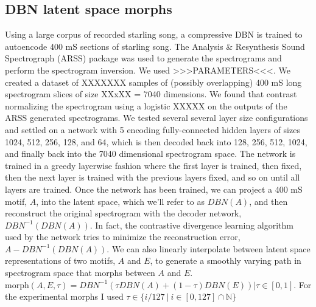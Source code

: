 \subsection*{\ac{DBN} latent space morphs}
Using a large corpus of recorded starling song, a compressive \ac{DBN} \cite{hinton2006reducing} is trained to autoencode 400 mS sections of starling song. The Analysis \& Resynthesis Sound Spectrograph (ARSS) package was used to generate the spectrograms and perform the spectrogram inversion. We used >>>PARAMETERS<<<. We created a dataset of XXXXXXX samples of (possibly overlapping) 400 mS long spectrogram slices of size XXxXX = 7040 dimensions. We found that contrast normalizing the spectrogram using a logistic XXXXX on the outputs of the ARSS generated spectrograms. We tested several several layer size configurations and settled on a network with 5 encoding fully-connected hidden layers of sizes 1024, 512, 256, 128, and 64, which is then decoded back into 128, 256, 512, 1024, and finally back into the 7040 dimensional spectrogram space. The network is trained in a greedy layerwise fashion where the first layer is trained, then fixed, then the next layer is trained with the previous layers fixed, and so on until all layers are trained. Once the network has been trained, we can project a 400 mS motif, $A$, into the latent space, which we'll refer to as $DBN(A)$, and then reconstruct the original spectrogram with the decoder network, $DBN^{-1}(DBN(A))$. In fact, the contrastive divergence learning algorithm used by the network tries to minimize the reconstruction error, $A - DBN^{-1}(DBN(A))$. We can also linearly interpolate between latent space representations of two motifs, $A$ and $E$, to generate a smoothly varying path in spectrogram space that morphs between $A$ and $E$. $\text{morph}(A, E, \tau) = DBN^{-1}(\tau DBN(A) + (1 - \tau) DBN(E)) | \tau \in [0, 1]$. For the experimental morphs I used $\tau \in \{ i/127\ |\ i \in [0, 127] \cap \mathbb{N}\}$

